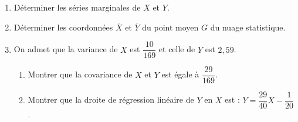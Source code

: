 \documentclass[11pt]{article}
\begin{document}
\begin{enumerate}
  \item Déterminer les séries marginales de $X$ et $Y$.
  \item Déterminer les coordonnées $\overline{X}$ et $\overline{Y}$ du point moyen $G$ du nuage statistique.
  \item On admet que la variance de $X$ est $\dfrac{10}{169}$ et celle de $Y$ est $2{,}59$.
  \begin{enumerate}[label=\alph*.]
    \item Montrer que la covariance de $X$ et $Y$ est égale à $\dfrac{29}{169}$.
    \item Montrer que la droite de régression linéaire de $Y$ en $X$ est : $Y = \dfrac{29}{40}X - \dfrac{1}{20}$.
  \end{enumerate}
\end{enumerate}
\end{document}

